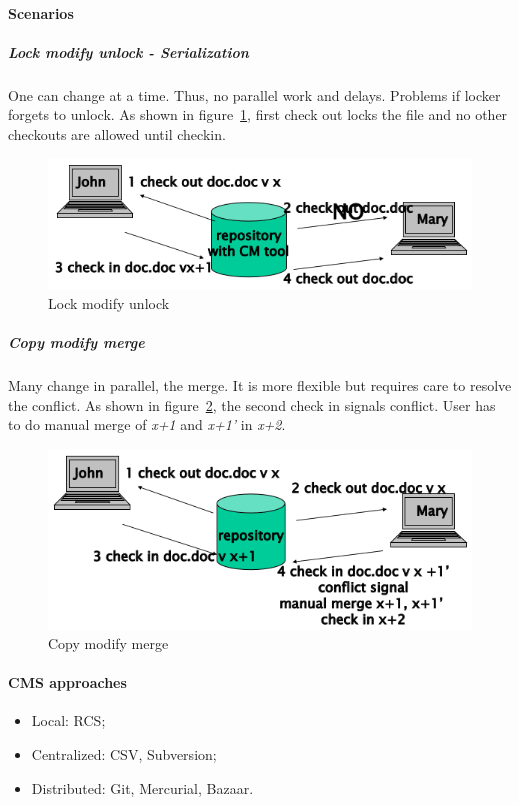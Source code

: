 \paragraph{Scenarios}
\subparagraph{Lock modify unlock - Serialization}
One can change at a time. Thus, no parallel work and delays. Problems if locker forgets to unlock. As shown in figure~\ref{img:lock_modify_unlock}, first check out locks the file and no other checkouts are allowed until checkin.

\begin{figure}[hbtp]
\centering
\includegraphics[scale=0.5]{images/lock_modify_unlock.png}
\caption{Lock modify unlock}
\label{img:lock_modify_unlock}
\end{figure}

\subparagraph{Copy modify merge}
Many change in parallel, the merge. It is more flexible but requires care to resolve the conflict. As shown in figure~\ref{img:copy_modify_merge}, the second check in signals conflict. User has to do manual merge of \emph{x+1} and \emph{x+1'} in \emph{x+2}.

\begin{figure}[hbtp]
\centering
\includegraphics[scale=0.5]{images/copy_modify_merge.png}
\caption{Copy modify merge}
\label{img:copy_modify_merge}
\end{figure}

\paragraph{CMS approaches}
\begin{itemize}
\item Local: RCS;
\item Centralized: CSV, Subversion;
\item Distributed: Git, Mercurial, Bazaar.
\end{itemize}


